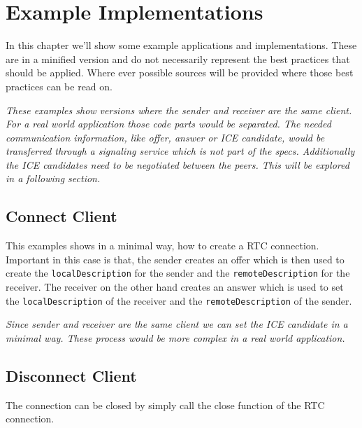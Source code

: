 \section{Example Implementations}
In this chapter we'll show some example applications and implementations. These are in a minified version and do not necessarily represent the best practices that should be applied. Where ever possible sources will be provided where those best practices can be read on.

\textit{These examples show versions where the sender and receiver are the same client. For a real world application those code parts would be separated. The needed communication information, like offer, answer or ICE candidate, would be transferred through a signaling service which is not part of the  specs. Additionally the ICE candidates need to be negotiated between the peers. This will be explored in a following section.}

\subsection{Connect Client}
This examples shows in a minimal way, how to create a RTC connection. Important in this case is that, the sender creates an offer which is then used to create the \lstinline[basicstyle=\ttfamily\color{black}]|localDescription| for the sender and the \lstinline[basicstyle=\ttfamily\color{black}]|remoteDescription| for the receiver. The receiver on the other hand creates an answer which is used to set the \lstinline[basicstyle=\ttfamily\color{black}]|localDescription| of the receiver and the \lstinline[basicstyle=\ttfamily\color{black}]|remoteDescription| of the sender.

\textit{Since sender and receiver are the same client we can set the ICE candidate in a minimal way. These process would be more complex in a real world application.}


\subsection{Disconnect Client}
The connection can be closed by simply call the close function of the RTC connection.


